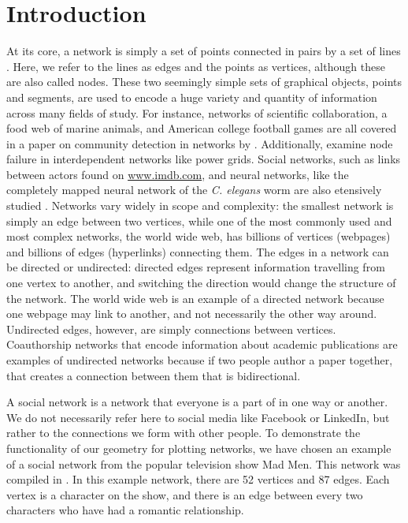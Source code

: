 \documentclass[11pt]{article}\usepackage[]{graphicx}\usepackage[]{color}
\begin{document}
\section{Introduction}
At its core, a network is simply a set of points connected in pairs by a set of lines \citep{newman}.  Here, we refer to the lines as edges and the points as vertices, although these are also called nodes.  These two seemingly simple sets of graphical objects, points and segments, are used to encode a huge variety and quantity of information across many fields of study. For instance, networks of scientific collaboration, a food web of marine animals, and American college football games are all covered in a paper on community detection in networks by \citet{football}.  Additionally, \citet{networkfailures} examine node failure in interdependent networks like power grids.  Social networks, such as links between actors found on \url{www.imdb.com}, and neural networks, like the completely mapped neural network of the \textit{C. elegans} worm are also etensively studied \citep{smallworld}.  Networks vary widely in scope and complexity: the smallest network is simply an edge between two vertices, while one of the most commonly used and most complex networks, the world wide web, has billions of vertices (webpages) and billions of edges (hyperlinks) connecting them.  The edges in a network can  be directed or undirected: directed edges represent information travelling from one vertex to another, and switching the direction would change the structure of the network. The world wide web is an example of a directed network because one webpage may link to another, and not necessarily the other way around. Undirected edges, however, are simply connections between vertices.  Coauthorship networks that encode information about academic publications are examples of undirected networks because if two people author a paper together, that creates a connection between them that is bidirectional.

\par A social network is a network that everyone is a part of in one way or another.  We do not necessarily refer here to social media like Facebook or LinkedIn, but rather to the connections we form with other people. To demonstrate the functionality of our geometry for plotting networks, we have chosen an example of a social network from the popular television show Mad Men.  This network was compiled in \citet{madmen}.  In this example network, there are 52 vertices and 87 edges. Each vertex is a character on the show, and there is an edge between every two characters who have had a romantic relationship.
\end{document}
